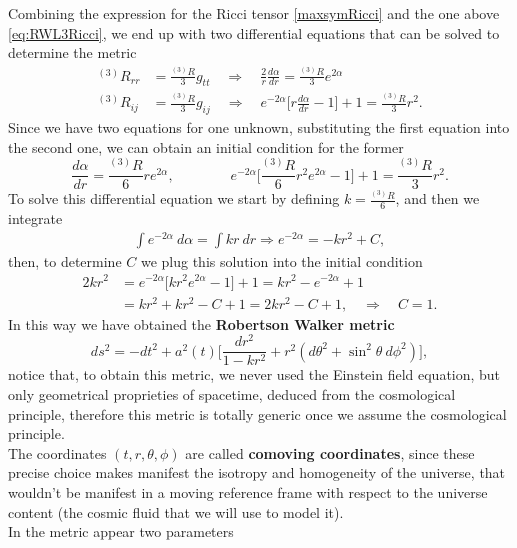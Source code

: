 Combining the expression for the Ricci tensor \eqref{maxsymRicci} and the one above \eqref{eq:RWL3Ricci}, we end up with two differential equations that can be solved to determine the metric
\begin{align*}
    ^{(3)}R_{rr}&=\frac{^{(3)}R}{3}g_{tt}\quad\Rightarrow\quad\boxed{\frac{2}{r}\frac{d\alpha}{dr}=\frac{^{(3)}R}{3}e^{2\alpha}}\\ ^{(3)}R_{ij}&=\frac{^{(3)}R}{3}g_{ij}\quad\Rightarrow\quad \boxed{e^{-2\alpha}\bigg[r\frac{d\alpha}{dr}-1\bigg]+1=\frac{^{(3)}R}{3}r^2}.
\end{align*}
Since we have two equations for one unknown, substituting the first equation into the second one, we can obtain an initial condition for the former
\begin{equation*}
    \frac{d\alpha}{dr}=\frac{^{(3)}R}{6}re^{2\alpha},\qquad\qquad e^{-2\alpha}\bigg[\frac{^{(3)}R}{6}r^2e^{2\alpha}-1\bigg]+1=\frac{^{(3)}R}{3}r^2.
\end{equation*}
To solve this differential equation we start by defining $k=\frac{^{(3)}R}{6}$, and then we integrate
\begin{align*}
    \int e^{-2\alpha}\ d\alpha=\int kr\ dr \Rightarrow e^{-2\alpha}=-kr^2+C,
\end{align*}
then, to determine $C$ we plug this solution into the initial condition
\begin{align*}
    2kr^2&=e^{-2\alpha}\bigg[kr^2e^{2\alpha}-1\bigg]+1=kr^2-e^{-2\alpha}+1\\
       &=kr^2+kr^2-C+1=2kr^2-C+1,\quad \Rightarrow\quad C=1.
\end{align*}    
In this way we have obtained the \textbf{Robertson Walker metric}
\begin{equation}\label{eq:RWMetric}
    ds^2=-dt^2+a^2(t)\bigg[\frac{dr^2}{1-kr^2}+r^2(d\theta^2+\sin^2\theta\ d\phi^2)\bigg],
\end{equation}
notice that, to obtain this metric, we never used the Einstein field equation, but only geometrical proprieties of spacetime, deduced from the cosmological principle, therefore this metric is totally generic once we assume the cosmological principle.\\
The coordinates $(t,r,\theta,\phi)$ are called \textbf{comoving coordinates}, since these precise choice makes manifest the isotropy and homogeneity of the universe, that wouldn't be manifest in a moving reference frame with respect to the universe content (the cosmic fluid that we will use to model it).\\
In the metric appear two parameters
